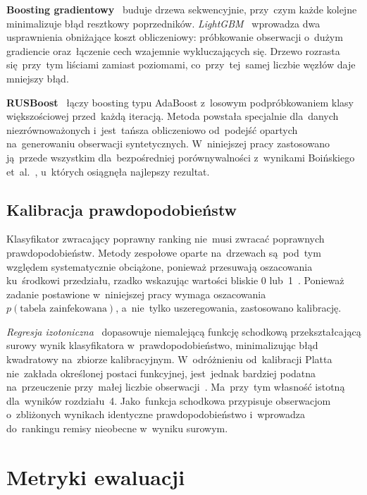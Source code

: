 \documentclass[polish,master,a4paper,oneside]{ppfcmthesis}
\renewcommand{\_}{\origtextunderscore\ifmmode\else\allowbreak\fi}
\begin{document}
\noindent\textbf{Boosting gradientowy}~\cite{Friedman2001} buduje drzewa sekwencyjnie, przy~czym każde
kolejne minimalizuje błąd resztkowy poprzedników.
\emph{LightGBM}~\cite{Ke2017} wprowadza dwa usprawnienia obniżające koszt
obliczeniowy: próbkowanie obserwacji o~dużym gradiencie oraz~łączenie cech
wzajemnie wykluczających się. Drzewo rozrasta się~przy~tym liściami zamiast
poziomami, co~przy~tej~samej liczbie węzłów daje mniejszy błąd.

\noindent\textbf{RUSBoost}~\cite{Seiffert2010} łączy boosting typu AdaBoost
z~losowym podpróbkowaniem klasy większościowej przed~każdą iteracją. Metoda
powstała specjalnie dla~danych niezrównoważonych i~jest~tańsza obliczeniowo
od~podejść opartych na~generowaniu obserwacji syntetycznych. W~niniejszej
pracy zastosowano ją~przede wszystkim dla~bezpośredniej porównywalności
z~wynikami Boińskiego et~al.~\cite{Boinski2025}, u~których osiągnęła
najlepszy rezultat.

\subsection{Kalibracja prawdopodobieństw}

Klasyfikator zwracający poprawny ranking nie~musi zwracać poprawnych
prawdopodobieństw. Metody zespołowe oparte na~drzewach są~pod~tym
względem systematycznie obciążone, ponieważ przesuwają oszacowania ku~środkowi
przedziału, rzadko wskazując wartości bliskie 0 lub~1~\cite{Niculescu2005}.
Ponieważ zadanie postawione w~niniejszej pracy wymaga oszacowania
$p(\text{tabela zainfekowana})$, a~nie~tylko uszeregowania, zastosowano
kalibrację.

\emph{Regresja izotoniczna}~\cite{Zadrozny2002} dopasowuje niemalejącą
funkcję schodkową przekształcającą surowy wynik klasyfikatora
w~prawdopodobieństwo, minimalizując błąd kwadratowy na~zbiorze
kalibracyjnym. W~odróżnieniu od~kalibracji Platta~\cite{Platt1999}
nie~zakłada określonej postaci funkcyjnej, jest~jednak bardziej podatna
na~przeuczenie przy~małej liczbie obserwacji~\cite{Niculescu2005}. Ma~przy~tym
własność istotną dla~wyników rozdziału~4. Jako~funkcja schodkowa przypisuje
obserwacjom o~zbliżonych wynikach identyczne prawdopodobieństwo i~wprowadza
do~rankingu remisy nieobecne w~wyniku surowym.

\section{Metryki ewaluacji}
\label{sec:metryki}
\end{document}
